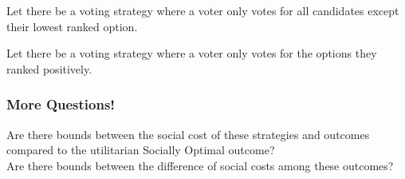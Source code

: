 \documentclass{article}
\begin{document}
Let there be a voting strategy where a voter only votes for all candidates except their lowest ranked option.

Let there be a voting strategy where a voter only votes for the options they ranked positively.

\subsubsection{More Questions!}

Are there bounds between the social cost of these strategies and outcomes compared to the utilitarian Socially Optimal outcome?\\
Are there bounds between the difference of social costs among these outcomes?
\end{document}
